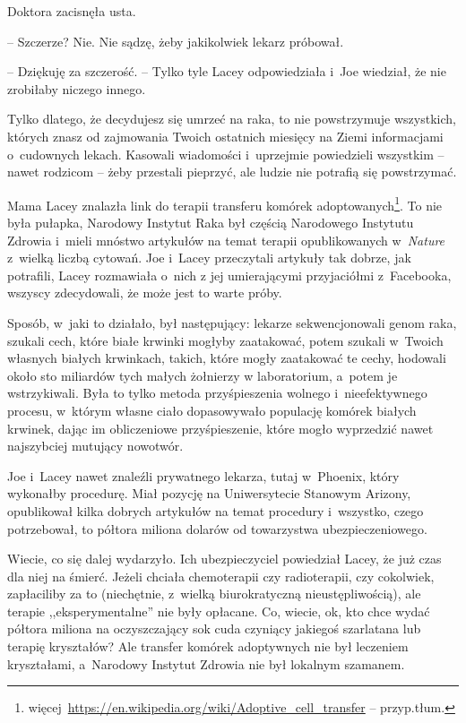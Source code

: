 \documentclass[oneside,polish,11pt,sfheadings]{mwbk}
\begin{document}
Doktora zacisnęła usta. 

-- Szczerze? Nie. Nie sądzę, żeby jakikolwiek
lekarz próbował.

-- Dziękuję za szczerość. -- Tylko tyle Lacey odpowiedziała i~Joe
wiedział, że nie zrobiłaby niczego innego.

Tylko dlatego, że decydujesz się umrzeć na raka, to nie powstrzymuje
wszystkich, których znasz od zajmowania Twoich ostatnich miesięcy na
Ziemi informacjami o~cudownych lekach. Kasowali wiadomości i~uprzejmie
powiedzieli wszystkim -- nawet rodzicom -- żeby przestali pieprzyć, ale
ludzie nie potrafią się powstrzymać.

Mama Lacey znalazła link do terapii transferu komórek adoptowanych\footnote{ więcej~\url{https://en.wikipedia.org/wiki/Adoptive\_cell\_transfer}
-- przyp.tłum.}. To nie była pułapka, Narodowy Instytut Raka był częścią
Narodowego Instytutu Zdrowia i~mieli mnóstwo artykułów na temat terapii
opublikowanych w~\textit{Nature} z~wielką liczbą cytowań. Joe i~Lacey
przeczytali artykuły tak dobrze, jak potrafili, Lacey rozmawiała o~nich
z jej umierającymi przyjaciółmi z~Facebooka, wszyscy zdecydowali, że
może jest to warte próby.

Sposób, w~jaki to działało, był następujący: lekarze sekwencjonowali
genom raka, szukali cech, które białe krwinki mogłyby zaatakować, potem
szukali w~Twoich własnych białych krwinkach, takich, które mogły
zaatakować te cechy, hodowali około sto miliardów tych małych żołnierzy
w laboratorium, a~potem je wstrzykiwali. Była to tylko metoda
przyśpieszenia wolnego i~nieefektywnego procesu, w~którym własne ciało
dopasowywało populację komórek białych krwinek, dając im obliczeniowe
przyśpieszenie, które mogło wyprzedzić nawet najszybciej mutujący
nowotwór.

Joe i~Lacey nawet znaleźli prywatnego lekarza, tutaj w~Phoenix, który
wykonałby procedurę. Miał pozycję na Uniwersytecie Stanowym Arizony,
opublikował kilka dobrych artykułów na temat procedury i~wszystko, czego
potrzebował, to półtora miliona dolarów od towarzystwa
ubezpieczeniowego.

Wiecie, co się dalej wydarzyło. Ich ubezpieczyciel powiedział Lacey, że
już czas dla niej na śmierć. Jeżeli chciała chemoterapii czy
radioterapii, czy cokolwiek, zapłaciliby za to (niechętnie, z~wielką
biurokratyczną nieustępliwością), ale terapie ,,eksperymentalne'' nie
były opłacane. Co, wiecie, ok, kto chce wydać półtora miliona na
oczyszczający sok cuda czyniący jakiegoś szarlatana lub terapię
kryształów? Ale transfer komórek adoptywnych nie był leczeniem
kryształami, a~Narodowy Instytut Zdrowia nie był lokalnym szamanem.
\end{document}
